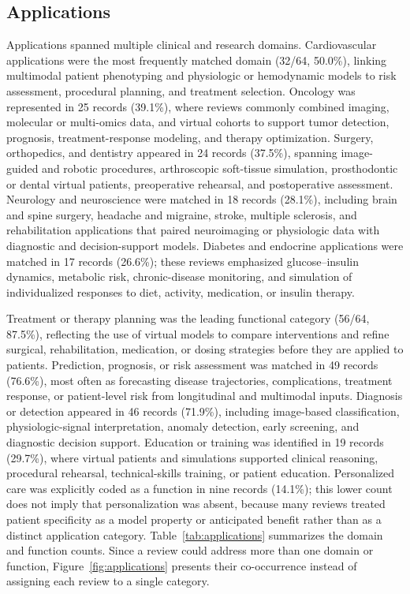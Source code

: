 \subsection{Applications}

Applications spanned multiple clinical and research domains. Cardiovascular applications were the most frequently matched domain (32/64, 50.0\%), linking multimodal patient phenotyping and physiologic or hemodynamic models to risk assessment, procedural planning, and treatment selection. Oncology was represented in 25 records (39.1\%), where reviews commonly combined imaging, molecular or multi-omics data, and virtual cohorts to support tumor detection, prognosis, treatment-response modeling, and therapy optimization. Surgery, orthopedics, and dentistry appeared in 24 records (37.5\%), spanning image-guided and robotic procedures, arthroscopic soft-tissue simulation, prosthodontic or dental virtual patients, preoperative rehearsal, and postoperative assessment. Neurology and neuroscience were matched in 18 records (28.1\%), including brain and spine surgery, headache and migraine, stroke, multiple sclerosis, and rehabilitation applications that paired neuroimaging or physiologic data with diagnostic and decision-support models. Diabetes and endocrine applications were matched in 17 records (26.6\%); these reviews emphasized glucose--insulin dynamics, metabolic risk, chronic-disease monitoring, and simulation of individualized responses to diet, activity, medication, or insulin therapy.

Treatment or therapy planning was the leading functional category (56/64, 87.5\%), reflecting the use of virtual models to compare interventions and refine surgical, rehabilitation, medication, or dosing strategies before they are applied to patients. Prediction, prognosis, or risk assessment was matched in 49 records (76.6\%), most often as forecasting disease trajectories, complications, treatment response, or patient-level risk from longitudinal and multimodal inputs. Diagnosis or detection appeared in 46 records (71.9\%), including image-based classification, physiologic-signal interpretation, anomaly detection, early screening, and diagnostic decision support. Education or training was identified in 19 records (29.7\%), where virtual patients and simulations supported clinical reasoning, procedural rehearsal, technical-skills training, or patient education. Personalized care was explicitly coded as a function in nine records (14.1\%); this lower count does not imply that personalization was absent, because many reviews treated patient specificity as a model property or anticipated benefit rather than as a distinct application category. Table~\ref{tab:applications} summarizes the domain and function counts. Since a review could address more than one domain or function, Figure~\ref{fig:applications} presents their co-occurrence instead of assigning each review to a single category.

